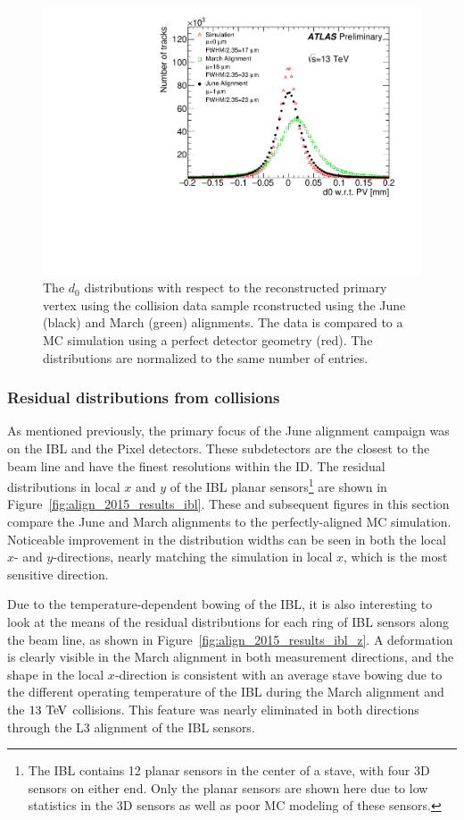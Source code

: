 \begin{figure}[htbp]
  \centering
  \includegraphics[width=.48\textwidth]{figs/alignment/align2015/d0_pvcorr}
  \caption{The $d_0$ distributions with respect to the reconstructed primary vertex using the  collision data sample rconstructed using the June (black) and March (green) alignments.  The data is compared to a MC simulation using a perfect detector geometry (red).  The distributions are normalized to the same number of entries.}
  \label{fig:align_2015_results_d0}
\end{figure}

\subsubsection{Residual distributions from collisions}\label{align:2015_results_residual}
As mentioned previously, the primary focus of the June alignment campaign was on the IBL and the Pixel detectors.
These subdetectors are the closest to the beam line and have the finest resolutions within the ID.
The residual distributions in local $x$ and $y$ of the IBL planar sensors\footnote{The IBL contains 12 planar sensors in the center of a stave, with four 3D sensors on either end.  Only the planar sensors are shown here due to low statistics in the 3D sensors as well as poor MC modeling of these sensors.} are shown in Figure~\ref{fig:align_2015_results_ibl}.
These and subsequent figures in this section compare the June and March alignments to the perfectly-aligned MC simulation.
Noticeable improvement in the distribution widths can be seen in both the local $x$- and $y$-directions, nearly matching the simulation in local $x$, which is the most sensitive direction.

Due to the temperature-dependent bowing of the IBL, it is also interesting to look at the means of the residual distributions for each ring of IBL sensors along the beam line, as shown in Figure~\ref{fig:align_2015_results_ibl_z}.
A deformation is clearly visible in the March alignment in both measurement directions, and the shape in the local $x$-direction is consistent with an average stave bowing due to the different operating temperature of the IBL during the March alignment and the $13\tev$ collisions.
This feature was nearly eliminated in both directions through the L3 alignment of the IBL sensors.

